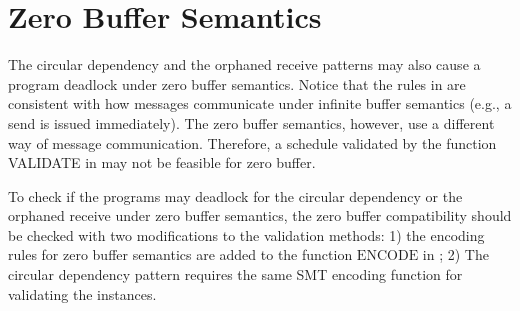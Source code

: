 \section{Zero Buffer Semantics}
The circular dependency and the orphaned receive patterns may also cause a program deadlock under zero buffer semantics. Notice that the rules in  are consistent with how messages communicate under infinite buffer semantics (e.g., a send is issued immediately). 
The zero buffer semantics, however, use a different way of message communication. 
Therefore, a schedule validated by the function \textrm{VALIDATE} in  may not be feasible for zero buffer. 

To check if the programs may deadlock for the circular dependency or the orphaned receive under zero buffer semantics, the zero buffer compatibility \cite{HuangNFM15} should be checked with two modifications to the validation methods: 1) the encoding rules for zero buffer semantics \cite{HuangNFM15} are added to the function $\mathrm{ENCODE}$ in ; 2) The circular dependency pattern requires the same SMT encoding function for validating the instances. 
